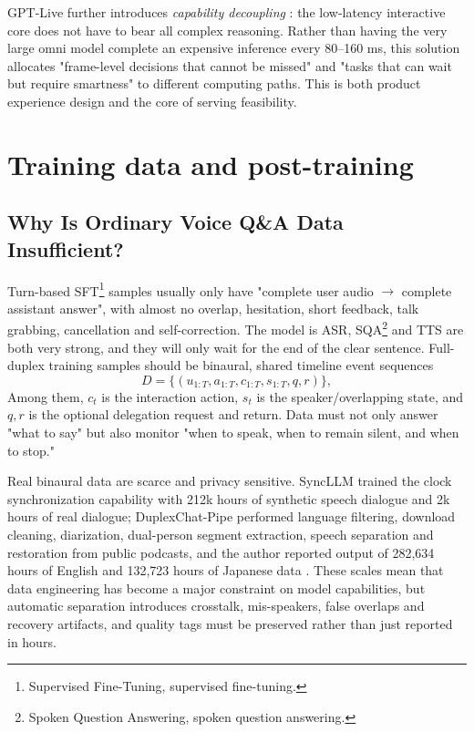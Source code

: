 \documentclass[UTF8,fontset=none,a4paper,10pt]{ctexart}
\begin{document}
GPT-Live further introduces \emph{ capability decoupling }: the low-latency interactive core does not have to bear all complex reasoning. Rather than having the very large omni model complete an expensive inference every 80--160 ms, this solution allocates "frame-level decisions that cannot be missed" and "tasks that can wait but require smartness" to different computing paths. This is both product experience design and the core of serving feasibility.

\section{Training data and post-training}

\subsection{Why Is Ordinary Voice Q\&A Data Insufficient?}

Turn-based SFT\footnote{Supervised Fine-Tuning, supervised fine-tuning. } samples usually only have "complete user audio $\to$ complete assistant answer", with almost no overlap, hesitation, short feedback, talk grabbing, cancellation and self-correction. The model is ASR, SQA\footnote{Spoken Question Answering, spoken question answering. } and TTS are both very strong, and they will only wait for the end of the clear sentence. Full-duplex training samples should be binaural, shared timeline event sequences
\begin{equation}
D=\{(u_{1:T},a_{1:T},c_{1:T},s_{1:T},q,r)\},
\end{equation}
Among them, $c_t$ is the interaction action, $s_t$ is the speaker/overlapping state, and $q,r$ is the optional delegation request and return. Data must not only answer "what to say" but also monitor "when to speak, when to remain silent, and when to stop."

Real binaural data are scarce and privacy sensitive. SyncLLM trained the clock synchronization capability \cite{veluri2024syncllm} with 212k hours of synthetic speech dialogue and 2k hours of real dialogue; DuplexChat-Pipe performed language filtering, download cleaning, diarization, dual-person segment extraction, speech separation and restoration from public podcasts, and the author reported output of 282,634 hours of English and 132,723 hours of Japanese data \cite{nakata2026duplexchat}. These scales mean that data engineering has become a major constraint on model capabilities, but automatic separation introduces crosstalk, mis-speakers, false overlaps and recovery artifacts, and quality tags must be preserved rather than just reported in hours.
\end{document}
